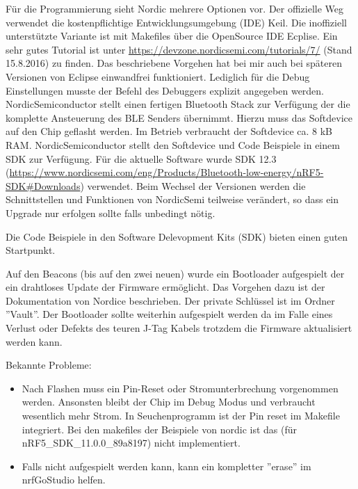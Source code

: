 \documentclass[11pt,ngerman]{scrartcl} %
\begin{document}
Für die Programmierung sieht Nordic mehrere Optionen vor. Der offizielle Weg verwendet die kostenpflichtige Entwicklungsumgebung (IDE) Keil. Die inoffiziell unterstützte Variante ist mit Makefiles über die OpenSource IDE Ecplise. Ein sehr gutes Tutorial ist unter \url{https://devzone.nordicsemi.com/tutorials/7/} (Stand 15.8.2016) zu finden. Das beschriebene Vorgehen hat bei mir auch bei späteren Versionen von Eclipse einwandfrei funktioniert. Lediglich für die Debug Einstellungen musste der Befehl des Debuggers explizit angegeben werden. 
NordicSemiconductor stellt einen fertigen Bluetooth Stack zur Verfügung der die komplette Ansteuerung des BLE Senders übernimmt. Hierzu muss das Softdevice auf den Chip geflasht werden. Im Betrieb verbraucht der Softdevice ca. 8 kB RAM.
NordicSemiconductor stellt den Softdevice und Code Beispiele in einem SDK zur Verfügung. Für die aktuelle Software wurde SDK 12.3 (\url{https://www.nordicsemi.com/eng/Products/Bluetooth-low-energy/nRF5-SDK\#Downloads}) verwendet. Beim Wechsel der Versionen werden die Schnittstellen und Funktionen von NordicSemi teilweise verändert, so dass ein Upgrade nur erfolgen sollte falls unbedingt nötig.

Die Code Beispiele in den Software Delevopment Kits (SDK) bieten einen guten Startpunkt. 

Auf den Beacons (bis auf den zwei neuen) wurde ein Bootloader aufgespielt der ein drahtloses Update der Firmware ermöglicht. Das Vorgehen dazu ist der Dokumentation von Nordice beschrieben. Der private Schlüssel ist im Ordner ''Vault''. Der Bootloader sollte weiterhin aufgespielt werden da im Falle eines Verlust oder Defekts des teuren J-Tag Kabels trotzdem die Firmware aktualisiert werden kann.


Bekannte Probleme:
\begin{itemize}
\item  Nach Flashen muss ein Pin-Reset oder Stromunterbrechung vorgenommen werden. Ansonsten bleibt der Chip im Debug Modus und verbraucht wesentlich mehr Strom.  In Seuchenprogramm ist der Pin reset im Makefile integriert. Bei den makefiles der Beispiele von nordic ist das (für nRF5\_SDK\_11.0.0\_89a8197) nicht implementiert.
\item Falls nicht aufgespielt werden kann, kann ein kompletter ''erase'' im nrfGoStudio helfen.
\end{itemize}
\end{document}
